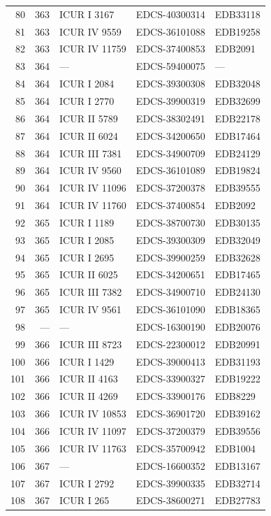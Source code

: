 \begin{longtable}{@{}r r l l l@{}}
80 & 363 & ICUR I 3167 & EDCS-40300314 & EDB33118 \\
81 & 363 & ICUR IV 9559 & EDCS-36101088 & EDB19258 \\
82 & 363 & ICUR IV 11759 & EDCS-37400853 & EDB2091 \\
83 & 364 & — & EDCS-59400075 & — \\
84 & 364 & ICUR I 2084 & EDCS-39300308 & EDB32048 \\
85 & 364 & ICUR I 2770 & EDCS-39900319 & EDB32699 \\
86 & 364 & ICUR II 5789 & EDCS-38302491 & EDB22178 \\
87 & 364 & ICUR II 6024 & EDCS-34200650 & EDB17464 \\
88 & 364 & ICUR III 7381 & EDCS-34900709 & EDB24129 \\
89 & 364 & ICUR IV 9560 & EDCS-36101089 & EDB19824 \\
90 & 364 & ICUR IV 11096 & EDCS-37200378 & EDB39555 \\
91 & 364 & ICUR IV 11760 & EDCS-37400854 & EDB2092 \\
92 & 365 & ICUR I 1189 & EDCS-38700730 & EDB30135 \\
93 & 365 & ICUR I 2085 & EDCS-39300309 & EDB32049 \\
94 & 365 & ICUR I 2695 & EDCS-39900259 & EDB32628 \\
95 & 365 & ICUR II 6025 & EDCS-34200651 & EDB17465 \\
96 & 365 & ICUR III 7382 & EDCS-34900710 & EDB24130 \\
97 & 365 & ICUR IV 9561 & EDCS-36101090 & EDB18365 \\
98 & — & — & EDCS-16300190 & EDB20076 \\
99 & 366 & ICUR III 8723 & EDCS-22300012 & EDB20991 \\
100 & 366 & ICUR I 1429 & EDCS-39000413 & EDB31193 \\
101 & 366 & ICUR II 4163 & EDCS-33900327 & EDB19222 \\
102 & 366 & ICUR II 4269 & EDCS-33900176 & EDB8229 \\
103 & 366 & ICUR IV 10853 & EDCS-36901720 & EDB39162 \\
104 & 366 & ICUR IV 11097 & EDCS-37200379 & EDB39556 \\
105 & 366 & ICUR IV 11763 & EDCS-35700942 & EDB1004 \\
106 & 367 & — & EDCS-16600352 & EDB13167 \\
107 & 367 & ICUR I 2792 & EDCS-39900335 & EDB32714 \\
108 & 367 & ICUR I 265 & EDCS-38600271 & EDB27783 \\

\end{longtable}

